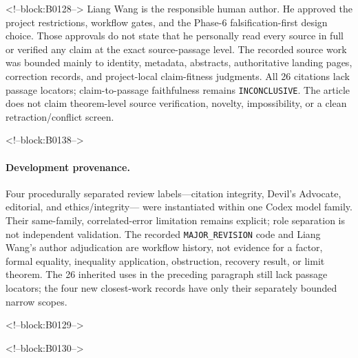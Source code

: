 \documentclass[11pt]{article}
\begin{document}
<!--block:B0128-->
Liang Wang is the responsible human author. He approved the project
restrictions, workflow gates, and the Phase-6 falsification-first design
choice. Those approvals do not state that he personally read every
source in full or verified any claim at the exact source-passage level.
The recorded source work was bounded mainly to identity, metadata,
abstracts, authoritative landing pages, correction records, and
project-local claim-fitness judgments. All 26 citations lack passage
locators; claim-to-passage faithfulness remains \texttt{INCONCLUSIVE}.
The article does not claim theorem-level source verification, novelty,
impossibility, or a clean retraction/conflict screen.

<!--block:B0138-->
\paragraph{Development provenance.}  Four procedurally separated review
labels---citation integrity, Devil's Advocate, editorial, and ethics/integrity---
were instantiated within one Codex model family.  Their same-family,
correlated-error limitation remains explicit; role separation is not independent
validation.  The recorded \texttt{MAJOR\_REVISION} code and Liang Wang's author
adjudication are workflow history, not evidence for a factor, formal equality,
inequality application, obstruction, recovery result, or limit theorem.  The 26
inherited uses in the preceding paragraph still lack passage locators; the four
new closest-work records have only their separately bounded narrow scopes.

<!--block:B0129-->



<!--block:B0130-->
\end{document}
